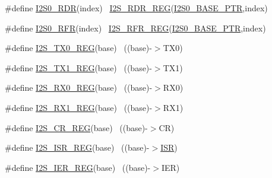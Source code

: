 \begin{DoxyCompactItemize}
\item 
\#define \hyperlink{group___i2_s___register___accessor___macros_ga37d505a0ce80827c6133a5d53346e73f}{I2\+S0\+\_\+\+R\+DR}(index)                                                ~\hyperlink{group___i2_s___register___accessor___macros_ga18b3e6efd2a957d910429a72b273bea9}{I2\+S\+\_\+\+R\+D\+R\+\_\+\+R\+EG}(\hyperlink{group___i2_s___peripheral_ga2eac5d85244610150239927c71b2e147}{I2\+S0\+\_\+\+B\+A\+S\+E\+\_\+\+P\+TR},index)
\item 
\#define \hyperlink{group___i2_s___register___accessor___macros_gab54d7c82666015d70bab5044fb12ef6d}{I2\+S0\+\_\+\+R\+FR}(index)                                                ~\hyperlink{group___i2_s___register___accessor___macros_ga0c209378f864f66e1f88468118ee87aa}{I2\+S\+\_\+\+R\+F\+R\+\_\+\+R\+EG}(\hyperlink{group___i2_s___peripheral_ga2eac5d85244610150239927c71b2e147}{I2\+S0\+\_\+\+B\+A\+S\+E\+\_\+\+P\+TR},index)
\item 
\#define \hyperlink{group___i2_s___register___accessor___macros_ga1266b6dd3fd649e0855776601ee72b9a}{I2\+S\+\_\+\+T\+X0\+\_\+\+R\+EG}(base)                                            ~((base)-\/$>$T\+X0)
\item 
\#define \hyperlink{group___i2_s___register___accessor___macros_ga549eed1c89efaa0b65c04ad0f018688b}{I2\+S\+\_\+\+T\+X1\+\_\+\+R\+EG}(base)                                            ~((base)-\/$>$T\+X1)
\item 
\#define \hyperlink{group___i2_s___register___accessor___macros_ga49e3e7a5009dabf13b9cc5269a7754e7}{I2\+S\+\_\+\+R\+X0\+\_\+\+R\+EG}(base)                                            ~((base)-\/$>$R\+X0)
\item 
\#define \hyperlink{group___i2_s___register___accessor___macros_ga52f0d2b1b72b7092cbec2eff2d30c870}{I2\+S\+\_\+\+R\+X1\+\_\+\+R\+EG}(base)                                            ~((base)-\/$>$R\+X1)
\item 
\#define \hyperlink{group___i2_s___register___accessor___macros_ga30d365c6706697f4064b50193217fe32}{I2\+S\+\_\+\+C\+R\+\_\+\+R\+EG}(base)                                              ~((base)-\/$>$CR)
\item 
\#define \hyperlink{group___i2_s___register___accessor___macros_ga236cd15b6493507b722b4a1f75ddddea}{I2\+S\+\_\+\+I\+S\+R\+\_\+\+R\+EG}(base)                                            ~((base)-\/$>$\hyperlink{z1_2board_8c_abd2ea147e2f49c556aed52a142c74998}{I\+SR})
\item 
\#define \hyperlink{group___i2_s___register___accessor___macros_gaa9d0edbafebdab6d0eebc3272b3d2d2d}{I2\+S\+\_\+\+I\+E\+R\+\_\+\+R\+EG}(base)                                            ~((base)-\/$>$I\+ER)

\end{DoxyCompactItemize}

